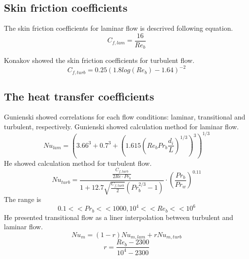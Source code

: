 \documentclass[12pt,oneside]{jbook}
\begin{document}
\subsection{Skin friction coefficients}
The skin friction coefficients for laminar flow is descrived following equation.
\begin{equation}
    C_{f,lam}=\frac{16}{Re_{b}}
    \label{cf_laminar}
\end{equation}

Konakov\cite{Petukhov1970} showed the skin friction coefficients for turbulent flow.
\begin{equation}
	C_{f,turb}=0.25(1.8log(Re_{b})-1.64)^{-2}
	\label{cf_turbulent}
\end{equation}

\subsection{The heat transfer coefficients}
Gunienski \cite{Gnielinski2013} showed correlations for each flow conditions: laminar, transitional and turbulent, respectively.
Gunienski \cite{Gnielinski2013} showed calculation method for laminar flow.
\begin{equation}
    Nu_{lam}=(3.66^{3}+0.7^{3}+(1.615(Re_{b}Pr_{b}\frac{d_{i}}{L})^{1/3})^{3})^{1/3}
    \label{Nu_laminar}
\end{equation}
He showed calculation method for turbulent flow.
\begin{equation}
    Nu_{turb}=\frac{\frac{C_{f,turb}}{2Re\cdot Pr_{b}}}{1+12.7 \sqrt{\frac{C_{f,turb}}{2}}(Pr_{b}^{2/3}-1)}\cdot (\frac{Pr_{b}}{Pr_{w}})^{0.11}
    \label{Nu_turbulent}
\end{equation}
The range is
\begin{equation}
    0.1<<Pr_{b}<<1000, 10^{4}<<Re_{b}<<10^{6}
\end{equation}
He presented transitional flow as a liner interpolation between turbulent and laminar flow.
\begin{equation}
    Nu_{m}=(1-r)Nu_{m,lam}+rNu_{m,turb}
    \label{Nu_transitional}
\end{equation}
\begin{equation}
    r=\frac{Re_{b}-2300}{10^{4}-2300}
	\label{Nu_transitional2}
\end{equation}
\end{document}
